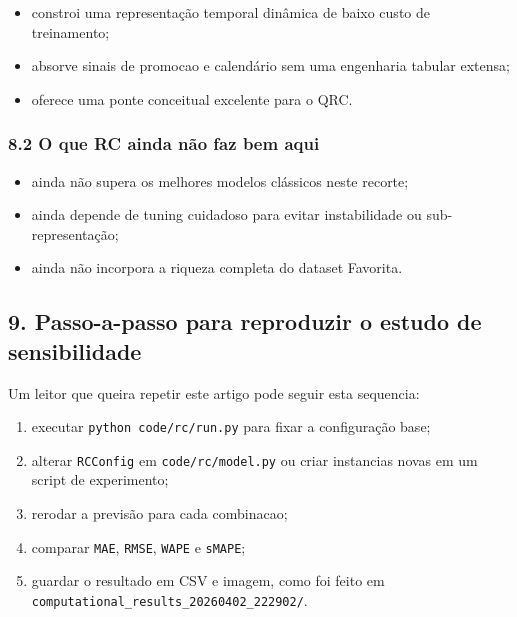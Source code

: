 \documentclass[12pt]{article}
\providecommand{\tightlist}{%
          \setlength{\itemsep}{0pt}\setlength{\parskip}{0pt}}
\begin{document}
\begin{itemize}
\tightlist
\item
  constroi uma representação temporal dinâmica de baixo custo de treinamento;
\item
  absorve sinais de promocao e calendário sem uma engenharia tabular extensa;
\item
  oferece uma ponte conceitual excelente para o QRC.
\end{itemize}

\subsubsection{8.2 O que RC ainda não faz bem aqui}\label{82-o-que-rc-ainda-nuxe3o-faz-bem-aqui}

\begin{itemize}
\tightlist
\item
  ainda não supera os melhores modelos clássicos neste recorte;
\item
  ainda depende de tuning cuidadoso para evitar instabilidade ou sub-representação;
\item
  ainda não incorpora a riqueza completa do dataset Favorita.
\end{itemize}

\subsection{9. Passo-a-passo para reproduzir o estudo de sensibilidade}\label{9-passo-a-passo-para-reproduzir-o-estudo-de-sensibilidade}

Um leitor que queira repetir este artigo pode seguir esta sequencia:

\begin{enumerate}
\def\labelenumi{\arabic{enumi}.}
\tightlist
\item
  executar \texttt{python\ code/rc/run.py} para fixar a configuração base;
\item
  alterar \texttt{RCConfig} em \texttt{code/rc/model.py} ou criar instancias novas em um script de experimento;
\item
  rerodar a previsão para cada combinacao;
\item
  comparar \texttt{MAE}, \texttt{RMSE}, \texttt{WAPE} e \texttt{sMAPE};
\item
  guardar o resultado em CSV e imagem, como foi feito em \texttt{computational\_results\_20260402\_222902/}.
\end{enumerate}
\end{document}
